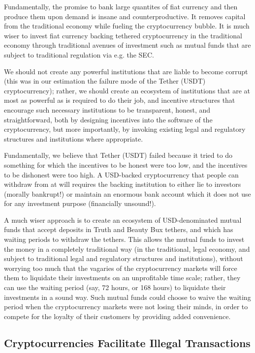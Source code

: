 \documentclass{article}
\begin{document}
Fundamentally, the promise to bank large quantites of fiat currency
and then produce them upon demand is insane and counterproductive. It
removes capital from the traditional economy while fueling the
cryptocurrency bubble. It is much wiser to invest fiat currency
backing tethered cryptocurrency in the traditional economy through
traditional avenues of investment such as mutual funds that are
subject to traditional regulation via e.g. the SEC.

We should not create any powerful institutions that are liable to
become corrupt (this was in our estimation the failure mode of the
Tether (USDT) cryptocurrency); rather, we should create an ecosystem
of institutions that are at most as powerful as is required to do
their job, and incentive structures that encourage such necessary
institutions to be transparent, honest, and straightforward, both by
designing incentives into the software of the cryptocurrency, but more
importantly, by invoking existing legal and regulatory structures and
institutions where appropriate.

Fundamentally, we believe that Tether (USDT) failed because it tried
to do something for which the incentives to be honest were too low,
and the incentives to be dishonest were too high. A USD-backed
cryptocurrency that people can withdraw from at will requires the
backing institution to either lie to investors (morally bankrupt!) or
maintain an enormous bank account which it does not use for any
investment purpose (financially unsound!).

A much wiser approach is to create an ecosystem of USD-denominated
mutual funds that accept deposits in Truth and Beauty Bux tethers, and
which has waiting periods to withdraw the tethers. This allows the
mutual funds to invest the money in a completely traditional way (in
the traditional, legal economy, and subject to traditional legal and
regulatory structures and institutions), without worrying too much
that the vagaries of the cryptocurrency markets will force them to
liquidate their investments on an unprofitable time scale; rather,
they can use the waiting period (say, 72 hours, or 168 hours) to
liquidate their investments in a sound way. Such mutual funds could
choose to waive the waiting period when the cryptocurrency markets
were not losing their minds, in order to compete for the loyalty of
their customers by providing added convenience.

\subsection{Cryptocurrencies Facilitate Illegal Transactions}
\end{document}
